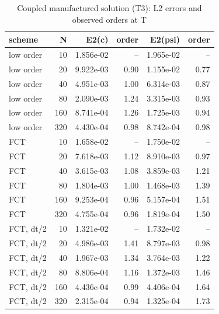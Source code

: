 \begin{table}[h]
\centering
\caption{Coupled manufactured solution (T3): L2 errors and observed orders at T}
\begin{tabular}{lrrrrr}
\hline
scheme & N & E2(c) & order & E2(psi) & order \\
\hline
low order & 10 & 1.856e-02 & -- & 1.965e-02 & -- \\
low order & 20 & 9.922e-03 & 0.90 & 1.155e-02 & 0.77 \\
low order & 40 & 4.951e-03 & 1.00 & 6.314e-03 & 0.87 \\
low order & 80 & 2.090e-03 & 1.24 & 3.315e-03 & 0.93 \\
low order & 160 & 8.741e-04 & 1.26 & 1.725e-03 & 0.94 \\
low order & 320 & 4.430e-04 & 0.98 & 8.742e-04 & 0.98 \\
FCT & 10 & 1.658e-02 & -- & 1.750e-02 & -- \\
FCT & 20 & 7.618e-03 & 1.12 & 8.910e-03 & 0.97 \\
FCT & 40 & 3.615e-03 & 1.08 & 3.859e-03 & 1.21 \\
FCT & 80 & 1.804e-03 & 1.00 & 1.468e-03 & 1.39 \\
FCT & 160 & 9.253e-04 & 0.96 & 5.157e-04 & 1.51 \\
FCT & 320 & 4.755e-04 & 0.96 & 1.819e-04 & 1.50 \\
FCT, dt/2 & 10 & 1.321e-02 & -- & 1.732e-02 & -- \\
FCT, dt/2 & 20 & 4.986e-03 & 1.41 & 8.797e-03 & 0.98 \\
FCT, dt/2 & 40 & 1.967e-03 & 1.34 & 3.764e-03 & 1.22 \\
FCT, dt/2 & 80 & 8.806e-04 & 1.16 & 1.372e-03 & 1.46 \\
FCT, dt/2 & 160 & 4.436e-04 & 0.99 & 4.406e-04 & 1.64 \\
FCT, dt/2 & 320 & 2.315e-04 & 0.94 & 1.325e-04 & 1.73 \\
\hline
\end{tabular}
\end{table}
